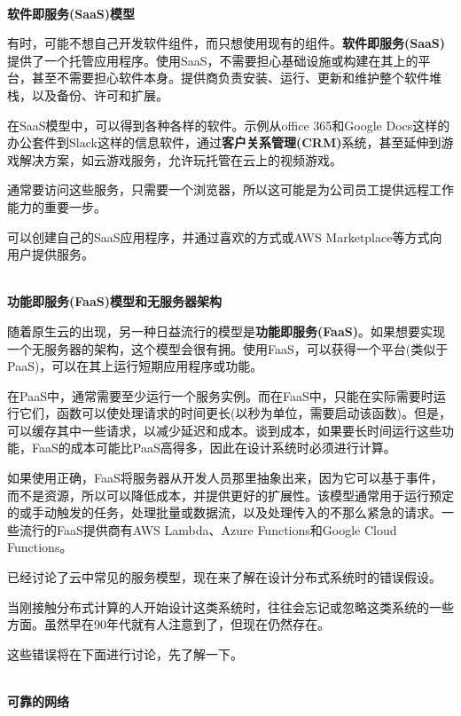 \hspace*{\fill} \\ %
\noindent
\textbf{软件即服务(SaaS)模型}

有时，可能不想自己开发软件组件，而只想使用现有的组件。\textbf{软件即服务(SaaS)}提供了一个托管应用程序。使用SaaS，不需要担心基础设施或构建在其上的平台，甚至不需要担心软件本身。提供商负责安装、运行、更新和维护整个软件堆栈，以及备份、许可和扩展。

在SaaS模型中，可以得到各种各样的软件。示例从office 365和Google Docs这样的办公套件到Slack这样的信息软件，通过\textbf{客户关系管理(CRM)}系统，甚至延伸到游戏解决方案，如云游戏服务，允许玩托管在云上的视频游戏。

通常要访问这些服务，只需要一个浏览器，所以这可能是为公司员工提供远程工作能力的重要一步。

可以创建自己的SaaS应用程序，并通过喜欢的方式或AWS Marketplace等方式向用户提供服务。

\hspace*{\fill} \\ %
\noindent
\textbf{功能即服务(FaaS)模型和无服务器架构}

随着原生云的出现，另一种日益流行的模型是\textbf{功能即服务(FaaS)}。如果想要实现一个无服务器的架构，这个模型会很有拥。使用FaaS，可以获得一个平台(类似于PaaS)，可以在其上运行短期应用程序或功能。

在PaaS中，通常需要至少运行一个服务实例。而在FaaS中，只能在实际需要时运行它们，函数可以使处理请求的时间更长(以秒为单位，需要启动该函数)。但是，可以缓存其中一些请求，以减少延迟和成本。谈到成本，如果要长时间运行这些功能，FaaS的成本可能比PaaS高得多，因此在设计系统时必须进行计算。

如果使用正确，FaaS将服务器从开发人员那里抽象出来，因为它可以基于事件，而不是资源，所以可以降低成本，并提供更好的扩展性。该模型通常用于运行预定的或手动触发的任务，处理批量或数据流，以及处理传入的不那么紧急的请求。一些流行的FaaS提供商有AWS Lambda、Azure Functions和Google Cloud Functions。

已经讨论了云中常见的服务模型，现在来了解在设计分布式系统时的错误假设。


当刚接触分布式计算的人开始设计这类系统时，往往会忘记或忽略这类系统的一些方面。虽然早在90年代就有人注意到了，但现在仍然存在。

这些错误将在下面进行讨论，先了解一下。

\hspace*{\fill} \\ %
\noindent
\textbf{可靠的网络}

